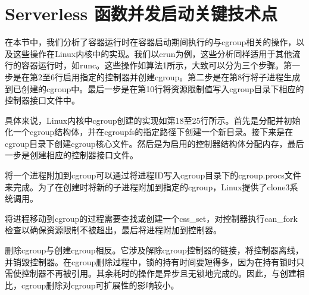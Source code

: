 

\section{Serverless 函数并发启动关键技术点}
在本节中，我们分析了容器运行时在容器启动期间执行的与cgroup相关的操作，以及这些操作在Linux内核中的实现。我们以crun为例，这些分析同样适用于其他流行的容器运行时，如runc。这些操作如算法1所示，大致可以分为三个步骤。第一步是在第2至6行启用指定的控制器并创建cgroup。第二步是在第8行将子进程生成到已创建的cgroup中。最后一步是在第10行将资源限制值写入cgroup目录下相应的控制器接口文件中。

具体来说，Linux内核中cgroup创建的实现如第18至25行所示。首先是分配并初始化一个cgroup结构体，并在cgroupfs的指定路径下创建一个新目录。接下来是在cgroup目录下创建cgroup核心文件。然后是为启用的控制器结构体分配内存，最后一步是创建相应的控制器接口文件。

将一个进程附加到cgroup可以通过将进程ID写入cgroup目录下的cgroup.procs文件来完成。为了在创建时将新的子进程附加到指定的cgroup，Linux提供了clone3系统调用。

将进程移动到cgroup的过程需要查找或创建一个css\_set，对控制器执行can\_fork检查以确保资源限制不被超出，最后将进程附加到控制器。

删除cgroup与创建cgroup相反。它涉及解除cgroup控制器的链接，将控制器离线，并销毁控制器。在cgroup删除过程中，锁的持有时间要短得多，因为在持有锁时只需使控制器不再被引用。其余耗时的操作是异步且无锁地完成的。因此，与创建相比，cgroup删除对cgroup可扩展性的影响较小。